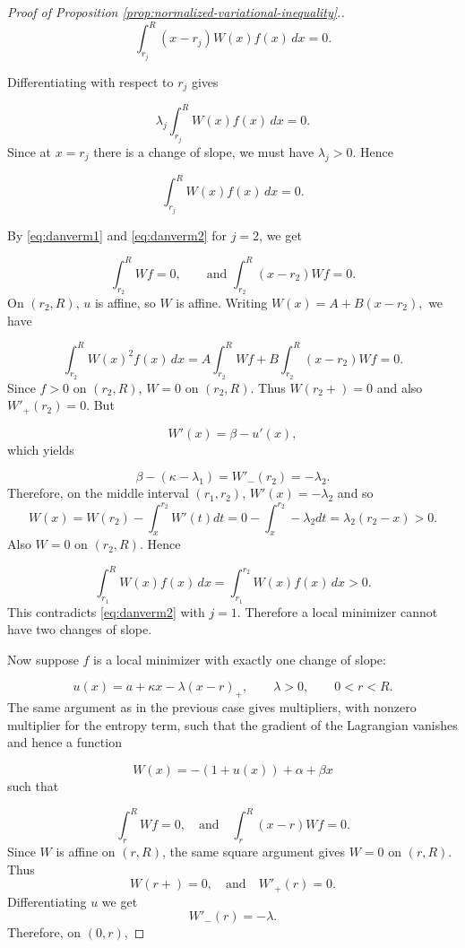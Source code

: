 \documentclass{article}
\theoremstyle{plain}
\theoremstyle{definition}
\newcommand{\dd}{\,d}
\newcommand{\1}{\mathbf 1}
\begin{document}
\begin{proof} [Proof of Proposition \ref{prop:normalized-variational-inequality}.]
\begin{equation}
\int_{r_j}^R (x-r_j)W(x)f(x)\dd x=0.
\label{eq:danverm1}
\end{equation}

Differentiating with respect to \(r_j\) gives

\[
\lambda_j\int_{r_j}^R W(x)f(x)\dd x = 0.
\]
Since at \(x = r_j\) there is a change of slope, we must have \(\lambda_j>0\). Hence

\begin{equation}
\int_{r_j}^R W(x)f(x)\dd x=0.
\label{eq:danverm2}
\end{equation}

By \ref{eq:danverm1} and \ref{eq:danverm2} for $j=2$, we get

\[
\int_{r_2}^R Wf=0,
\qquad \text{and }
\int_{r_2}^R (x-r_2)Wf=0.
\]
On \((r_2,R)\), \(u\) is affine, so \(W\) is affine. Writing
\(
W(x)=A+B(x-r_2),
\)
we have

\[
\int_{r_2}^R W(x)^2f(x)\dd x
=
A\int_{r_2}^R Wf
+
B\int_{r_2}^R (x-r_2)Wf
=
0.
\]
Since \(f>0\) on \((r_2,R)\),
$
W=0$
on $(r_2,R).$
Thus
$W(r_2+)=0$ and also $W'_+(r_2)=0.$
But

\[
W'(x)=\beta-u'(x),
\]
which yields

\[
\beta -(\kappa -\lambda_1) = W'_-(r_2)=-\lambda_2.
\]
Therefore, on the middle interval \((r_1,r_2)\),
$W'(x) = -\lambda_2$ and so
\[
W(x)=W(r_2) - \int_{x}^{r_2}W'(t)dt = 0 - \int_{x}^{r_2}-\lambda_2dt = \lambda_2(r_2-x)>0.
\]
Also \(W=0\) on \((r_2,R)\). Hence

\[
\int_{r_1}^R W(x)f(x)\dd x
=
\int_{r_1}^{r_2} W(x)f(x)\dd x
>0.
\]
This contradicts \ref{eq:danverm2}
 with \(j=1\). Therefore a local minimizer cannot have two changes of slope.

Now suppose \(f\) is a local minimizer with exactly one change of slope:

\[
u(x)=a+\kappa x-\lambda(x-r)_+,
\qquad
\lambda>0,
\qquad
0<r<R.
\]
The same argument as in the previous case gives multipliers, with  nonzero multiplier for the entropy term, such that the gradient of the Lagrangian vanishes and hence a function

\[
W(x)=-(1+u(x))+\alpha+\beta x
\]
such that

\[
\int_r^R Wf=0,
\quad \text{and} \quad
\int_r^R (x-r)Wf=0.
\]
Since \(W\) is affine on \((r,R)\), the same square argument gives
$W=0$ on $(r,R).$
Thus
\[
W(r+)=0,
\quad \text{and} \quad
W'_+(r)=0.
\]
Differentiating $u$ we get
\[
W'_-(r)=-\lambda.
\]
Therefore, on \((0,r)\),


\end{proof}
\end{document}

